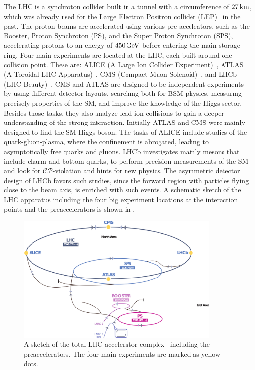 The LHC is a synchroton collider built in a tunnel with a circumference of $27\,\text{km}$, which was already used for the Large Electron Positron collider (LEP)~\cite{LEPCollider} in the past. The proton beams are accelerated using various pre-acceleators, such as the Booster, Proton Synchroton (PS), and the Super Proton Synchroton (SPS), accelerating protons to an energy of $450\,\text{Ge\hspace{-.08em}V}$ before entering the main storage ring. Four main experiments are located at the LHC, each built around one collision point. These are: ALICE (A Large Ion Collider Experiment)~\cite{ALICE}, ATLAS (A Toroidal LHC Apparatus)~\cite{ATLAS}, CMS (Compact Muon Solenoid)~\cite{CMS}, and LHCb (LHC Beauty)~\cite{LHCb}. CMS and ATLAS are designed to be independent experiments by using different detector layouts, searching both for BSM physics, measuring precisely properties of the SM, and improve the knowledge of the Higgs sector. Besides those tasks, they also analyze lead ion collisions to gain a deeper understanding of the strong interaction. Initially ATLAS and CMS were mainly designed to find the SM Higgs boson. The tasks of ALICE include studies of the quark-gluon-plasma, where the confinement is abrogated, leading to asymptotically free quarks and gluons. LHCb investigates mainly mesons that include charm and bottom quarks, to perform precision measurements of the SM and look for $\mathcal{CP}$-violation and hints for new physics. The asymmetric detector design of LHCb favors such studies, since the forward region with particles flying close to the beam axis, is enriched with such events. A schematic sketch of the LHC apparatus including the four big experiment locations at the interaction points and the preaccelerators is shown in .\\
\begin{figure}[tbp]
 \centering
 \includegraphics[width=0.89\textwidth]{figures/general/LHC}
 \caption{A sketch of the total LHC accelerator complex~\cite{LHCPicture} including the preaccelerators. The four main experiments are marked as yellow dots.}
 \label{fig:LHC}
\end{figure}
